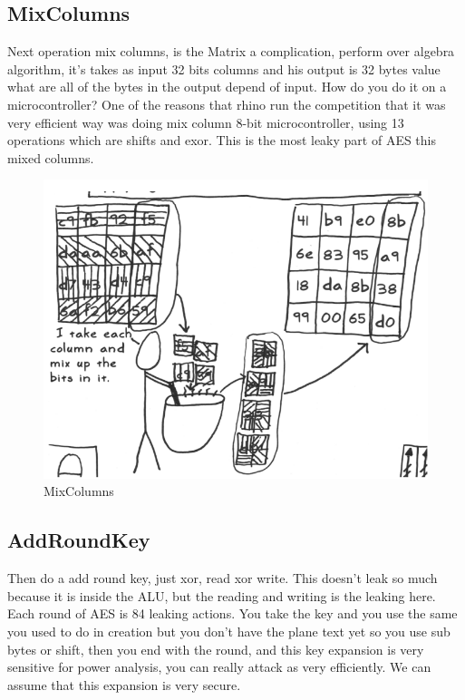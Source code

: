 \subsection{MixColumns}

Next operation mix columns, is the Matrix a complication, perform over algebra algorithm, it's takes as input 32 bits columns and his output is 32 bytes value what are all of the bytes in the output depend of input. How do you do it on a microcontroller? One of the reasons that rhino run the competition that it was very efficient way was doing mix column 8-bit microcontroller, using 13 operations which are shifts and exor. This is the most leaky part of AES this mixed columns.

\begin{figure}[htp]
\centering
\includegraphics[scale=0.2]{images/Lecture_5/mixcolumns.png}
\caption{MixColumns}\label{fig:MixColumns}
\end{figure}

\subsection{AddRoundKey}

Then do a add round key, just xor, read xor write. This doesn't leak so much because it is inside the ALU, but the reading and writing is the leaking here.
Each round of AES is 84 leaking actions. You take the key and you use the same you used to do in creation but you don't have the plane text yet so you use sub bytes or shift, then you end with the round, and this key expansion is very sensitive for power analysis, you can really attack as very efficiently. We can assume that this expansion is very secure.


